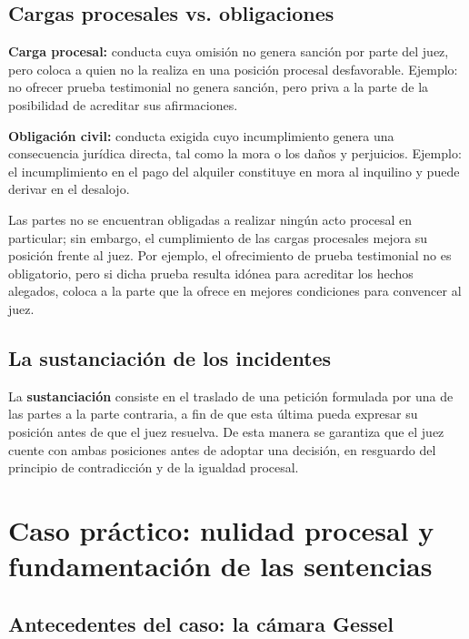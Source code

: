 \documentclass[12pt,oneside]{book}
\begin{document}
\subsection{Cargas procesales vs. obligaciones}

\begin{important}
\textbf{Carga procesal:} conducta cuya omisión no genera sanción por parte del juez, pero coloca a quien no la realiza en una posición procesal desfavorable. Ejemplo: no ofrecer prueba testimonial no genera sanción, pero priva a la parte de la posibilidad de acreditar sus afirmaciones.

\textbf{Obligación civil:} conducta exigida cuyo incumplimiento genera una consecuencia jurídica directa, tal como la mora o los daños y perjuicios. Ejemplo: el incumplimiento en el pago del alquiler constituye en mora al inquilino y puede derivar en el desalojo.
\end{important}

Las partes no se encuentran obligadas a realizar ningún acto procesal en particular; sin embargo, el cumplimiento de las cargas procesales mejora su posición frente al juez. Por ejemplo, el ofrecimiento de prueba testimonial no es obligatorio, pero si dicha prueba resulta idónea para acreditar los hechos alegados, coloca a la parte que la ofrece en mejores condiciones para convencer al juez.

\subsection{La sustanciación de los incidentes}

La \textbf{sustanciación} consiste en el traslado de una petición formulada por una de las partes a la parte contraria, a fin de que esta última pueda expresar su posición antes de que el juez resuelva. De esta manera se garantiza que el juez cuente con ambas posiciones antes de adoptar una decisión, en resguardo del principio de contradicción y de la igualdad procesal.

\section{Caso práctico: nulidad procesal y fundamentación de las sentencias}

\subsection{Antecedentes del caso: la cámara Gessel}
\end{document}
